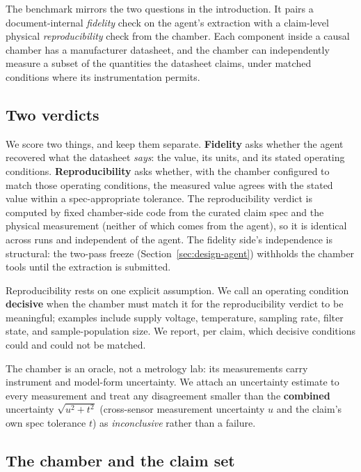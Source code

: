 \documentclass[11pt]{article}
\begin{document}
The benchmark mirrors the two questions in the introduction. It pairs a
document-internal \emph{fidelity} check on the agent's extraction with a
claim-level physical \emph{reproducibility} check from the chamber. Each
component inside a causal chamber \citep{gamella2025chambers} has a
manufacturer datasheet, and the chamber can independently measure a
subset of the quantities the datasheet claims, under matched conditions
where its instrumentation permits.

\subsection{Two verdicts}
\label{sec:design-verdicts}

We score two things, and keep them separate. \textbf{Fidelity} asks
whether the agent recovered what the datasheet \emph{says}: the value,
its units, and its stated operating conditions. \textbf{Reproducibility}
asks whether, with the chamber configured to match those operating
conditions, the measured value agrees with the stated value within a
spec-appropriate tolerance. The reproducibility verdict is computed by fixed
chamber-side code from the curated claim spec and the physical
measurement (neither of which comes from the agent), so it is identical
across runs and independent of the agent. The fidelity side's
independence is structural: the two-pass freeze
(Section~\ref{sec:design-agent}) withholds the chamber tools until the
extraction is submitted.

Reproducibility rests on one explicit assumption. We call an operating
condition \textbf{decisive} when the chamber must match it for the
reproducibility verdict to be meaningful; examples include supply
voltage, temperature, sampling rate, filter state, and
sample-population size. We report, per claim, which decisive
conditions could and could not be matched.

The chamber is an oracle, not a metrology lab: its measurements carry
instrument and model-form uncertainty. We attach an uncertainty estimate
to every measurement and treat any disagreement smaller than the
\textbf{combined} uncertainty $\sqrt{u^2+t^2}$ (cross-sensor
measurement uncertainty $u$ and the claim's own spec tolerance $t$) as
\emph{inconclusive} rather than a failure.

\subsection{The chamber and the claim set}
\label{sec:design-claims}
\end{document}
